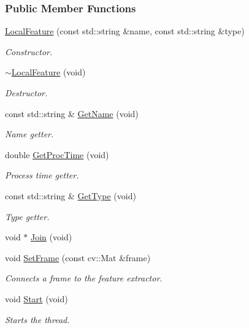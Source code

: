 \subsubsection*{Public Member Functions}
\begin{DoxyCompactItemize}
\item 
\hyperlink{group___feature_extractor_abc8f5b5d4088fd28be45cfd6b3d86cd5}{Local\-Feature} (const std\-::string \&name, const std\-::string \&type)
\begin{DoxyCompactList}\small\item\em Constructor. \end{DoxyCompactList}\item 
\hyperlink{group___feature_extractor_a457aceba33c8ef0f0ccaf4db8c679545}{$\sim$\-Local\-Feature} (void)
\begin{DoxyCompactList}\small\item\em Destructor. \end{DoxyCompactList}\item 
const std\-::string \& \hyperlink{group___feature_extractor_ab2ecc77360b2fa1400f29298a8e1b751}{Get\-Name} (void)
\begin{DoxyCompactList}\small\item\em Name getter. \end{DoxyCompactList}\item 
double \hyperlink{group___feature_extractor_a46f41fabf78e63d9e9c93cbaadf652a1}{Get\-Proc\-Time} (void)
\begin{DoxyCompactList}\small\item\em Process time getter. \end{DoxyCompactList}\item 
const std\-::string \& \hyperlink{group___feature_extractor_aba5fb3207f97ae73dc3cab7572baf85e}{Get\-Type} (void)
\begin{DoxyCompactList}\small\item\em Type getter. \end{DoxyCompactList}\item 
void $\ast$ \hyperlink{group___core_a8f33f7750321d5df9188033e7e3e300d}{Join} (void)
\item 
void \hyperlink{group___feature_extractor_aee5c4e09e373308e7f50bfaffd8e2267}{Set\-Frame} (const cv\-::\-Mat \&frame)
\begin{DoxyCompactList}\small\item\em Connects a frame to the feature extractor. \end{DoxyCompactList}\item 
void \hyperlink{group___core_a2b42f82341afd2747ea093b6ac8b91cb}{Start} (void)
\begin{DoxyCompactList}\small\item\em Starts the thread. \end{DoxyCompactList}\end{DoxyCompactItemize}
